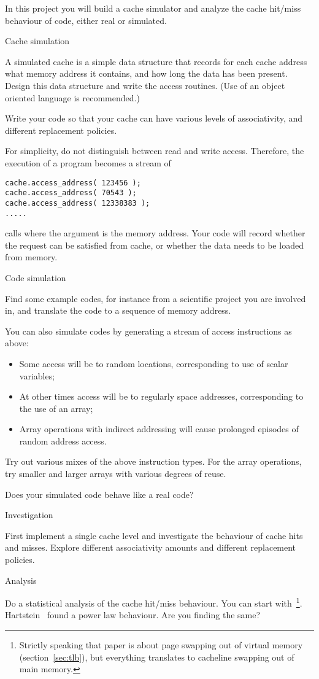 In this project you will build a cache simulator and analyze the cache
hit/miss behaviour of code, either real or simulated.

 {Cache simulation}

A simulated cache is a simple data structure that records for each
cache address what memory address it contains, and how long the data
has been present. Design this data structure and write the access
routines. (Use of an object oriented language is recommended.)

Write your code so that your cache can have various levels of
associativity, and different replacement policies.

For simplicity, do not distinguish between read and write
access. Therefore, the execution of a program becomes a stream of
\begin{verbatim}
cache.access_address( 123456 );
cache.access_address( 70543 );
cache.access_address( 12338383 );
.....
\end{verbatim}
calls where the argument is the memory address. Your code will record
whether the request can be satisfied from cache, or whether the data
needs to be loaded from memory.

 {Code simulation}

Find some example codes, for instance from a scientific project you
are involved in, and translate the code to a sequence of memory
address. 

You can also simulate codes by generating a stream of access
instructions as above:
\begin{itemize}
\item Some access will be to random locations, corresponding to use of
  scalar variables;
\item At other times access will be to regularly space addresses,
  corresponding to the use of an array;
\item Array operations with indirect addressing will cause prolonged
  episodes of random address access.
\end{itemize}
Try out various mixes of the above instruction types. For the array
operations, try smaller and larger arrays with various degrees of
reuse.

Does your simulated code behave like a real code?

 {Investigation}

First implement a single cache level and investigate the behaviour of
cache hits and misses. Explore different associativity amounts and
different replacement policies.

 {Analysis}

Do a statistical analysis of the cache hit/miss behaviour. You can
start with~\cite{Rao:1978:cache}\footnote{Strictly speaking that paper
  is about page swapping out of virtual memory
  (section~\ref{sec:tlb}), but everything translates to cacheline
  swapping out of main memory.}. Hartstein~\cite{Hartstein:cache-sqrt}
found a power law behaviour. Are you finding the same?

